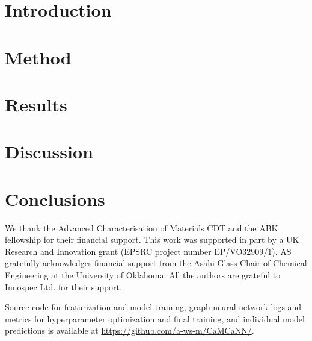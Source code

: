 \documentclass[journal=jcisd8,manuscript=article]{achemso}
\begin{document}
\section{Introduction}



\section{Method}



\section{Results}



\section{Discussion}



\section{Conclusions}



\begin{acknowledgement}
We thank the Advanced Characterisation of Materials CDT and the ABK fellowship
for their financial support. This work was supported in part by a UK Research
and Innovation grant (EPSRC project number EP/VO32909/1). AS gratefully
acknowledges financial support from the Asahi Glass Chair of Chemical
Engineering at the University of Oklahoma. All the authors are grateful to
Innospec Ltd. for their support.
\end{acknowledgement}

\begin{suppinfo}

    Source code for featurization and model training, graph neural network logs
    and metrics for hyperparameter optimization and final training, and
    individual model predictions is available at
    \url{https://github.com/a-ws-m/CaMCaNN/}.

\end{suppinfo}
\end{document}
